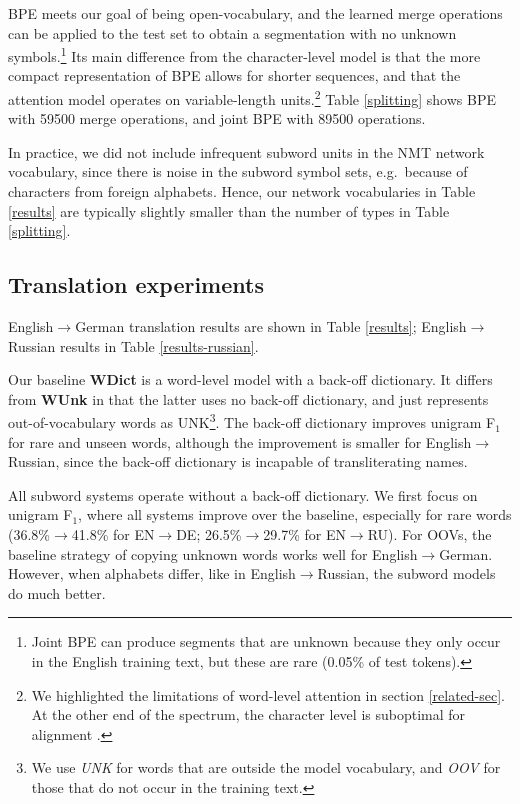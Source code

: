 BPE meets our goal of being open-vocabulary, and the learned merge operations can be applied to the test set to obtain a segmentation with no unknown symbols.\footnote{Joint BPE can produce segments that are unknown because they only occur in the English training text, but these are rare (0.05\% of test tokens).} Its main difference from the character-level model is that the more compact representation of BPE allows for shorter sequences, and that the attention model operates on variable-length units.\footnote{We highlighted the limitations of word-level attention in section \ref{related-sec}. At the other end of the spectrum, the character level is suboptimal for alignment \cite{Tiedemann474916}.} Table \ref{splitting} shows BPE with \num{59500} merge operations, and joint BPE with \num{89500} operations.

In practice, we did not include infrequent subword units in the NMT network vocabulary, since there is noise in the subword symbol sets, e.g.\ because of characters from foreign alphabets. Hence, our network vocabularies in Table \ref{results} are typically slightly smaller than the number of types in Table \ref{splitting}.

\subsection{Translation experiments}

English$\to$German translation results are shown in Table \ref{results};
English$\to$Russian results in Table \ref{results-russian}.

Our baseline \textbf{WDict} is a word-level model with a back-off dictionary. It differs from \textbf{WUnk} in that the latter uses no back-off dictionary, and just represents out-of-vocabulary words as UNK\footnote{We use \emph{UNK} for words that are outside the model vocabulary, and \emph{OOV} for those that do not occur in the training text.}. The back-off dictionary improves unigram F$_1$ for rare and unseen words, although the improvement is smaller for English$\to$Russian, since the back-off dictionary is incapable of transliterating names.

All subword systems operate without a back-off dictionary. We first focus on unigram F$_1$, where all systems improve over the baseline, especially for rare words (36.8\%$\rightarrow$41.8\% for EN$\to$DE; 26.5\%$\rightarrow$29.7\% for EN$\to$RU).
For OOVs, the baseline strategy of copying unknown words works well for English$\to$German.
However, when alphabets differ, like in English$\to$Russian, the subword models do much better.


